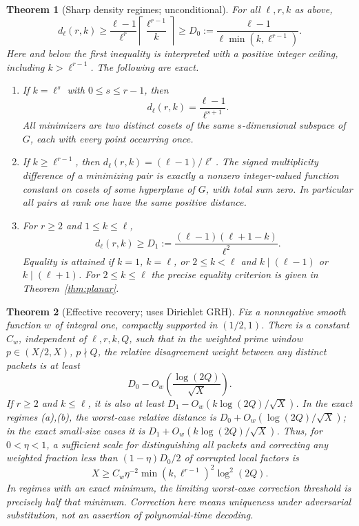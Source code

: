 \documentclass[11pt]{article}
\newtheorem{theorem}{Theorem}[section]
\theoremstyle{remark}\newtheorem{remark}[theorem]{Remark}
\newcommand{\ceil}[1]{\left\lceil #1\right\rceil}
\begin{document}
\begin{theorem}[Sharp density regimes; unconditional]\label{thm:main}
For all $\ell,r,k$ as above,
\begin{equation}\label{eq:master}
 d_\ell(r,k)\ge \frac{\ell-1}{\ell^r}\ceil{\frac{\ell^{r-1}}{k}}\ge
 D_0:=\frac{\ell-1}{\ell\min(k,\ell^{r-1})}.
\end{equation}
Here and below the first inequality is interpreted with a positive integer ceiling, including $k>\ell^{r-1}$. The following are exact.
\begin{enumerate}[label=(\alph*)]
\item If $k=\ell^s$ with $0\le s\le r-1$, then
\[d_\ell(r,k)=\frac{\ell-1}{\ell^{s+1}}.\]
All minimizers are two distinct cosets of the same $s$-dimensional subspace of $G$, each with every point occurring once.
\item If $k\ge\ell^{r-1}$, then $d_\ell(r,k)=(\ell-1)/\ell^r$. The signed multiplicity difference of a minimizing pair is exactly a nonzero integer-valued function constant on cosets of some hyperplane of $G$, with total sum zero. In particular all pairs at rank one have the same positive distance.
\item For $r\ge2$ and $1\le k\le\ell$,
\begin{equation}\label{eq:pencil}
 d_\ell(r,k)\ge D_1:=\frac{(\ell-1)(\ell+1-k)}{\ell^2}.
\end{equation}
Equality is attained if $k=1$, $k=\ell$, or $2\le k<\ell$ and $k\mid(\ell-1)$ or $k\mid(\ell+1)$. For $2\le k\le\ell$ the precise equality criterion is given in Theorem~\ref{thm:planar}.
\end{enumerate}
\end{theorem}

\begin{theorem}[Effective recovery; uses Dirichlet GRH]\label{thm:effintro}
Fix a nonnegative smooth function $w$ of integral one, compactly supported in $(1/2,1)$. There is a constant $C_w$, independent of $\ell,r,k,Q$, such that in the weighted prime window $p\in(X/2,X)$, $p\nmid Q$, the relative disagreement weight between any distinct packets is at least
\[
 D_0-O_w\left(\frac{\log(2Q)}{\sqrt X}\right).
\]
If $r\ge2$ and $k\le\ell$, it is also at least $D_1-O_w(k\log(2Q)/\sqrt X)$. In the exact regimes (a),(b), the worst-case relative distance is $D_0+O_w(\log(2Q)/\sqrt X)$; in the exact small-size cases it is $D_1+O_w(k\log(2Q)/\sqrt X)$. Thus, for $0<\eta<1$, a sufficient scale for distinguishing all packets and correcting any weighted fraction less than $(1-\eta)D_0/2$ of corrupted local factors is
\[ X\ge C_w\eta^{-2}\min(k,\ell^{r-1})^2\log^2(2Q).\]
In regimes with an exact minimum, the limiting worst-case correction threshold is precisely half that minimum. Correction here means uniqueness under adversarial substitution, not an assertion of polynomial-time decoding.
\end{theorem}
\end{document}
